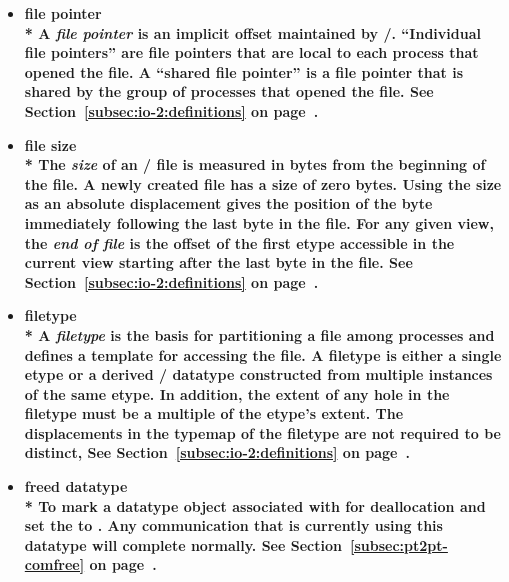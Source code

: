 \begin{itemize}
\label{glossary:file_pointer}
\item \bf{ file pointer} \\*
A {\it file pointer} is an implicit offset maintained by \MPI/.
``Individual file pointers'' are file pointers that are local to
each process that opened the file.
A ``shared file pointer'' is a file pointer that is shared by
the group of processes that opened the file.
See Section~\ref{subsec:io-2:definitions} on page~\pageref{subsec:io-2:definitions}.

\label{glossary:file_size}
\item \bf{ file size} \\*
The {\it size} of an \MPI/ file is measured in bytes from the 
beginning of the file.  A newly created file has a size of zero 
bytes.  Using the size as an absolute displacement gives 
the position of the byte immediately following the last byte in 
the file.  For any given view, the {\it end of file} is the 
offset of the first etype accessible in the current view starting
after the last byte in the file.
See Section~\ref{subsec:io-2:definitions} on page~\pageref{subsec:io-2:definitions}.

\label{glossary:filetype}
\item \bf{ filetype} \\* 
A {\it filetype} is the basis for partitioning a file among processes
and defines a template for accessing the file.
A filetype is either a single etype or a derived \MPI/ datatype
constructed from multiple instances of the same etype.
In addition,
the extent of any hole in the filetype
must be a multiple of the etype's extent.
The displacements in the typemap of the filetype are not required to be distinct,
See Section~\ref{subsec:io-2:definitions} on page~\pageref{subsec:io-2:definitions}.

\label{glossary:freed_datatype}
\item \bf{ freed datatype} \\*
To mark a datatype object associated with  for
deallocation and set the  to .
Any communication that is currently using this datatype will complete 
normally.
See Section~\ref{subsec:pt2pt-comfree} on page~\pageref{subsec:pt2pt-comfree}.


\end{itemize}
